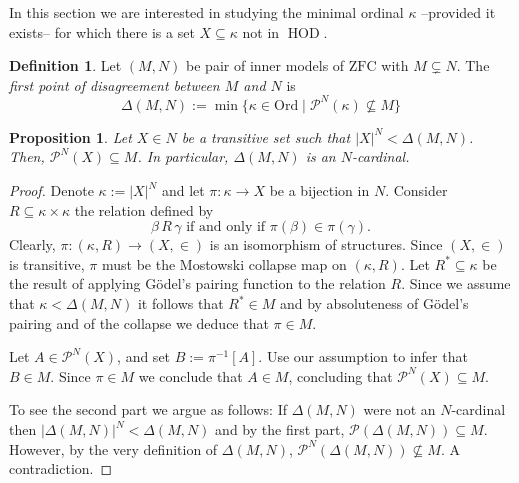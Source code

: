 \documentclass[11pt]{amsart}
\newtheorem{proposition}[theorem]{Proposition}
\theoremstyle{definition}
\newtheorem{definition}[theorem]{Definition}
\theoremstyle{remark}
\DeclareMathOperator{\crit}{crit}
\DeclareMathOperator{\HOD}{HOD}
\def\s{\subseteq}
\newcommand\ale[1]{\marginpar{Alejandro: #1}}
\begin{document}
In this section we are interested in studying the minimal ordinal $\kappa$ --provided  it exists-- for which there is a set $X\s \kappa$ not in $\HOD$. 

\begin{definition}
    Let $(M,N)$ be pair of inner models of $\mathrm{ZFC}$ with $M\subsetneq N$. The \emph{first point of disagreement between $M$ and $N$} is
    $$\Delta(M,N):=\min\{\kappa\in \mathrm{Ord}\mid \mathcal{P}^N(\kappa)\nsubseteq M\}$$
\end{definition}

\begin{proposition}\label{prop: basic coding}
    Let $X\in N$ be a transitive set such that $|X|^N<\Delta(M,N)$. Then, $\mathcal{P}^N(X)\subseteq M$. In particular, $\Delta(M,N)$ is an $N$-cardinal.
\end{proposition}
\begin{proof}
    Denote  $\kappa:=|X|^N$ and let $\pi\colon \kappa \to X$ be a bijection in $N$. Consider $R\s \kappa\times \kappa$ the relation defined by $$\text{$\beta\, R\, \gamma$ if and only if $\pi(\beta)\in \pi(\gamma)$.}$$ Clearly, $\pi\colon (\kappa, R)\to (X,\in)$ is an isomorphism of structures. Since $(X,\in)$ is transitive, $\pi$ must be the Mostowski collapse map on $(\kappa,R)$. 
    Let $R^* \s \kappa$ be the result of applying Gödel's pairing function to the relation $R$. Since we assume that  $\kappa < \Delta(M,N)$ it follows that  $R^*\in M$ and by absoluteness of Gödel's pairing and of the collapse we deduce that  $\pi\in M$. 

Let $A\in \mathcal{P}^N(X)$, and set $B:=\pi^{-1}[A]$. Use our assumption to infer that $B\in M$. Since $\pi\in M$ we conclude that $A\in M$, concluding that $\mathcal{P}^N(X)\subseteq M$.

 To see the second part we argue as follows:  If  $\Delta(M,N)$ were not an $N$-cardinal then $|\Delta(M,N)|^N<\Delta(M,N)$ and by the first part, $\mathcal{P}(\Delta(M,N))\s M$. However, by the very definition of $\Delta(M,N)$, $\mathcal{P}^N(\Delta(M,N))\not\subseteq M$. A contradiction.
\end{proof}
\end{document}
